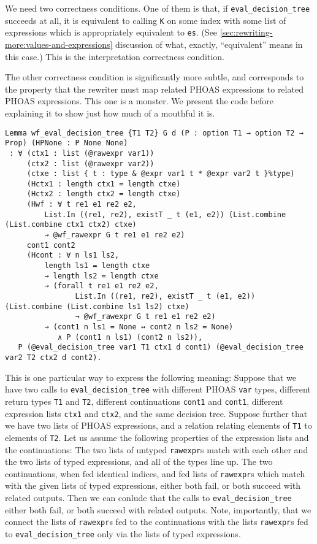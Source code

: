 We need two correctness conditions.
One of them is that, if \texttt{eval_decision_tree} succeeds at all, it is equivalent to calling \texttt{K} on some index with some list of expressions which is appropriately equivalent to \texttt{es}.
(See \autoref{sec:rewriting-more:values-and-expressions} discussion of what, exactly, ``equivalent'' means in this case.)
This is the interpretation correctness condition.

The other correctness condition is significantly more subtle, and corresponds to the property that the rewriter must map related PHOAS expressions to related PHOAS expressions.
This one is a monster.
We present the code before explaining it to show just how much of a mouthful it is.
\begin{verbatim}
Lemma wf_eval_decision_tree {T1 T2} G d (P : option T1 → option T2 → Prop) (HPNone : P None None)
 : ∀ (ctx1 : list (@rawexpr var1))
     (ctx2 : list (@rawexpr var2))
     (ctxe : list { t : type & @expr var1 t * @expr var2 t }%type)
     (Hctx1 : length ctx1 = length ctxe)
     (Hctx2 : length ctx2 = length ctxe)
     (Hwf : ∀ t re1 e1 re2 e2,
         List.In ((re1, re2), existT _ t (e1, e2)) (List.combine (List.combine ctx1 ctx2) ctxe)
         → @wf_rawexpr G t re1 e1 re2 e2)
     cont1 cont2
     (Hcont : ∀ n ls1 ls2,
         length ls1 = length ctxe
         → length ls2 = length ctxe
         → (forall t re1 e1 re2 e2,
                List.In ((re1, re2), existT _ t (e1, e2)) (List.combine (List.combine ls1 ls2) ctxe)
                → @wf_rawexpr G t re1 e1 re2 e2)
         → (cont1 n ls1 = None ↔ cont2 n ls2 = None)
            ∧ P (cont1 n ls1) (cont2 n ls2)),
   P (@eval_decision_tree var1 T1 ctx1 d cont1) (@eval_decision_tree var2 T2 ctx2 d cont2).
\end{verbatim}
This is one particular way to express the following meaning:
Suppose that we have two calls to \texttt{eval_decision_tree} with different PHOAS \texttt{var} types, different return types \texttt{T1} and \texttt{T2}, different continuations \texttt{cont1} and \texttt{cont1}, different expression lists \texttt{ctx1} and \texttt{ctx2}, and the same decision tree.
Suppose further that we have two lists of PHOAS expressions, and a relation relating elements of \texttt{T1} to elements of \texttt{T2}.
Let us assume the following properties of the expression lists and the continuations:
The two lists of untyped \texttt{rawexpr}s match with each other and the two lists of typed expressions, and all of the types line up.
The two continuations, when fed identical indices, and fed lists of \texttt{rawexpr}s which match with the given lists of typed expressions, either both fail, or both succeed with related outputs.
Then we can conlude that the calls to \texttt{eval_decision_tree} either both fail, or both succeed with related outputs.
Note, importantly, that we connect the lists of \texttt{rawexpr}s fed to the continuations with the lists \texttt{rawexpr}s fed to \texttt{eval_decision_tree} only via the lists of typed expressions.

